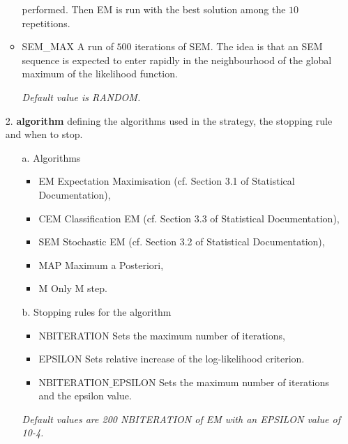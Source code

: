 \begin{itemize}
\begin{itemize}
performed. Then EM is run with the best solution among the $10$ repetitions.
             \item SEM\_MAX  A run of $500$ iterations of SEM. The idea is that an SEM sequence is
expected to enter rapidly in the neighbourhood of the global maximum
of the likelihood function.
             \item[] {\it Default value is RANDOM.}
           \end{itemize}
 \item[2.] {\bf algorithm} defining the algorithms used in the strategy, the stopping rule and when to stop.
            \begin{itemize}
             \item[a.] Algorithms
                \begin{itemize}
                 \item EM Expectation Maximisation (cf. Section 3.1 of Statistical Documentation),
                 \item CEM Classification EM (cf. Section 3.3 of Statistical Documentation),
                 \item SEM Stochastic EM (cf. Section 3.2 of Statistical Documentation),
                 \item MAP Maximum a Posteriori,
                 \item M Only M step.
                \end{itemize}
             \item[b.] Stopping rules for the algorithm
                \begin{itemize}
                 \item NBITERATION Sets the maximum number of iterations,
                 \item EPSILON Sets relative increase of the log-likelihood criterion.
                 \item NBITERATION$\_$EPSILON Sets the maximum number of iterations and the epsilon value.
                \end{itemize}
               \item[] {\it Default values are 200 NBITERATION of EM with an EPSILON value of 10-4.}
            \end{itemize}
\end{itemize}


